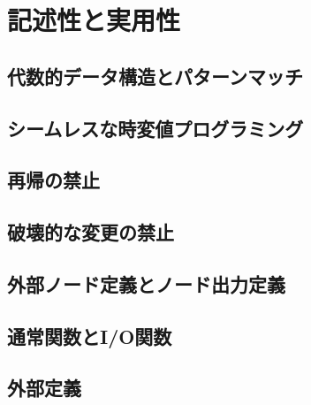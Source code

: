 \chapter{記述性と実用性}
\section{代数的データ構造とパターンマッチ}
\section{シームレスな時変値プログラミング}
\section{再帰の禁止}
\section{破壊的な変更の禁止}
\section{外部ノード定義とノード出力定義}
\section{通常関数とI/O関数}
\section{外部定義}
